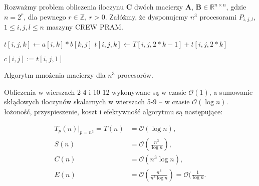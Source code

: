 
Rozważmy problem obliczenia iloczynu \(\mathbf{C}\) dwóch macierzy \(\mathbf{A}\), \(\mathbf{B}\in\mathbb{R}^{n\times n}\), gdzie \(n=2^r\), dla pewnego \(r\in\mathbb{Z},\, r>0\). Załóżmy, że dysponujemy \(n^3\) procesorami \(P_{i,j,l}\), \(1\leq i, j, l \leq n\) maszyny CREW PRAM. 

\begin{algorithm}
\centering
\begin{algorithmic}[1]
\State \(t[i,j,k] \gets a[i,k]*b[k,j]\)
\EndParFor
{} 
	\State \(t[i,j,k] \gets T[i,j,2*k-1]+t[i,j,2*k]\)
\EndParFor
\EndFor

\State \(c[i,j] := t[i,j,1] \)
\EndParFor
\end{algorithmic}
\caption{Algorytm mnożenia macierzy dla \(n^3\) procesorów.\cite{Czech}}
\label{alg:pram_multiply_1}
\end{algorithm}


Obliczenia w wierszach 2-4 i 10-12 wykonywane są w czasie \(\mathcal{O}(1)\), a sumowanie skłądowych iloczynów skalarnych w wierszach 5-9 – w czasie \(\mathcal{O}(\log{n})\). łożoność, przyspieszenie, koszt i efektywność algorytmu są następujące\cite{Czech}:

\begin{align*}
T_p(n)|_{p=n^3} = T(n) &= \mathcal{O}(\log{n}), \\
S(n) &= \mathcal{O}(\frac{n^3}{\log{n}}), \\
C(n) &= \mathcal{O}(n^3 \log{n}), \\
E(n) &= \mathcal{O}(\frac{n^3}{n^3 \log{n}})=\mathcal{O}(\frac{1}{\log{n}}.
\end{align*}

